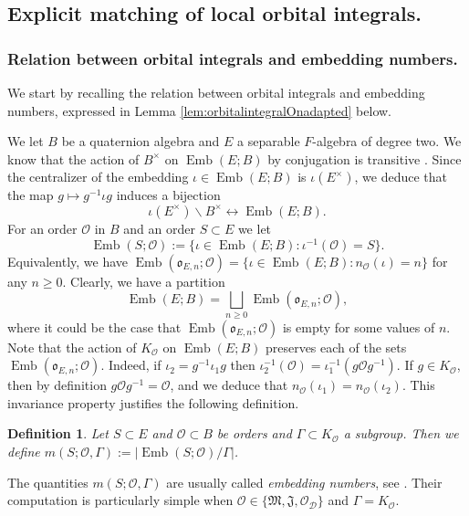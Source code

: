 \documentclass{article}
\newtheorem{defi}[lem]{Definition}
\theoremstyle{named}
\newcommand{\D}{\mathcal{D}}
\newcommand{\M}{\mathfrak{M}}
\newcommand{\J}{\mathfrak{J}}
\renewcommand{\O}{\mathcal{O}}
\renewcommand{\o}{\mathfrak{o}}
\DeclareMathOperator{\Emb}{Emb}
\begin{document}
\subsection{Explicit matching of local orbital integrals.}\label{subsec:proofoflocalmatching}

\subsubsection{Relation between orbital integrals and embedding numbers.}
We start by recalling the relation between orbital integrals and embedding numbers, expressed in Lemma \ref{lem:orbitalintegralOnadapted} below. 

We let $B$ be a quaternion algebra and $E$ a separable $F$-algebra of degree two. We know that the action of $B^\times$ on $\Emb(E; B)$ by conjugation is transitive \cite[Corollary 7.1.5]{voight}. Since the centralizer of the embedding $\iota \in \Emb(E; B)$ is $\iota(E^\times)$, we deduce that the map $g \mapsto g^{-1}\iota g$ induces a bijection
\begin{equation*}
    \iota(E^\times)\backslash B^\times \longleftrightarrow \Emb(E; B).
\end{equation*}
For an order $\O$ in $B$ and an order $S \subset E$ we let 
\begin{equation*}
    \Emb(S; \O) := \{\iota \in \Emb(E; B) : \iota^{-1}(\O) = S\}.
\end{equation*}
Equivalently, we have $\Emb(\o_{E, n}; \O) = \{\iota \in \Emb(E; B) : n_\O(\iota) = n\}$ for any $n\geq 0$. Clearly, we have a partition
\begin{equation*}
    \Emb(E; B) = \bigsqcup_{n \geq 0} \Emb(\o_{E, n}; \O),
\end{equation*}
where it could be the case that $\Emb(\o_{E, n}; \O)$ is empty for some values of $n$. Note that the action of $K_\O$ on $\Emb(E; B)$ preserves each of the sets $\Emb(\o_{E, n}; \O)$. Indeed, if $\iota_2 = g^{-1}\iota_1 g$ then $\iota_2^{-1}(\O) = \iota_1^{-1}(g\O g^{-1})$. If $g \in K_\O$, then by definition $g\O g^{-1} = \O$, and we deduce that $n_\O(\iota_1) = n_\O(\iota_2)$. This invariance property justifies the following definition.

\begin{defi}\label{defi:embeddingnumbers}
Let $S \subset E$ and $\O\subset B$ be orders and $\Gamma \subset K_\O$ a subgroup. Then we define $m(S; \O, \Gamma) := |\Emb(S; \O) / \Gamma|$.
\end{defi}
The quantities $m(S; \O, \Gamma)$ are usually called \emph{embedding numbers}, see \cite[Chapter 30]{voight}. Their computation is particularly simple when $\O \in \{\M, \J, \O_\D\}$ and $\Gamma = K_\O$.
\end{document}
